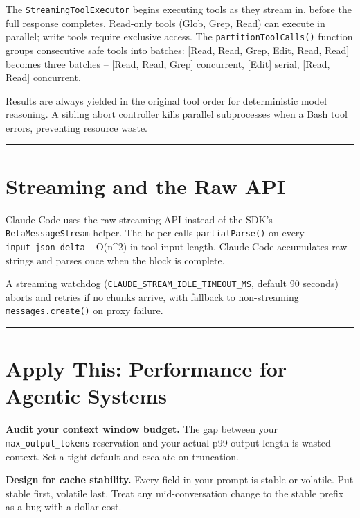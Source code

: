 \documentclass[
  english,
  11pt,
  letterpaper,
]{book}
\begin{document}
The \texttt{StreamingToolExecutor} begins executing tools as they stream
in, before the full response completes. Read-only tools (Glob, Grep,
Read) can execute in parallel; write tools require exclusive access. The
\texttt{partitionToolCalls()} function groups consecutive safe tools
into batches: {[}Read, Read, Grep, Edit, Read, Read{]} becomes three
batches -- {[}Read, Read, Grep{]} concurrent, {[}Edit{]} serial,
{[}Read, Read{]} concurrent.

Results are always yielded in the original tool order for deterministic
model reasoning. A sibling abort controller kills parallel subprocesses
when a Bash tool errors, preventing resource waste.

\begin{center}\rule{0.5\linewidth}{0.5pt}\end{center}

\section{Streaming and the Raw API}\label{streaming-and-the-raw-api}

Claude Code uses the raw streaming API instead of the SDK's
\texttt{BetaMessageStream} helper. The helper calls
\texttt{partialParse()} on every \texttt{input\_json\_delta} --
O(n\^{}2) in tool input length. Claude Code accumulates raw strings and
parses once when the block is complete.

A streaming watchdog (\texttt{CLAUDE\_STREAM\_IDLE\_TIMEOUT\_MS},
default 90 seconds) aborts and retries if no chunks arrive, with
fallback to non-streaming \texttt{messages.create()} on proxy failure.

\begin{center}\rule{0.5\linewidth}{0.5pt}\end{center}

\section{Apply This: Performance for Agentic
Systems}\label{apply-this-performance-for-agentic-systems}

\textbf{Audit your context window budget.} The gap between your
\texttt{max\_output\_tokens} reservation and your actual p99 output
length is wasted context. Set a tight default and escalate on
truncation.

\textbf{Design for cache stability.} Every field in your prompt is
stable or volatile. Put stable first, volatile last. Treat any
mid-conversation change to the stable prefix as a bug with a dollar
cost.
\end{document}
